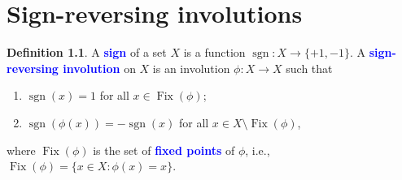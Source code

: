 \documentclass[oneside]{book}
\numberwithin{equation}{section}
\theoremstyle{definition}
\newtheorem{defn}[thm]{Definition}
\newcommand\Fix{\operatorname{Fix}}
\newcommand\sgn{\operatorname{sgn}}
\renewcommand\emph[1]{\textcolor{blue}{\bf #1}}
\begin{document}








\newpage

\appendix

\chapter{Sign-reversing involutions}
\label{sec:sign-revers-invol}

\begin{defn}
  A \emph{sign} of a set \( X \) is a function
  \( \sgn:X \to \{+1,-1\} \). A \emph{sign-reversing involution} on
  \( X \) is an involution \( \phi:X\to X \) such that
  \begin{enumerate}
  \item \( \sgn(x)=1 \) for all \( x\in \Fix(\phi) \);
  \item \( \sgn(\phi(x)) = -\sgn(x) \) for all
  \( x\in X \setminus \Fix(\phi) \),
  \end{enumerate}
  where \( \Fix(\phi) \) is the set of \emph{fixed points} of
  \( \phi \), i.e., \( \Fix(\phi) = \{x\in X: \phi(x) = x \} \).
\end{defn}
\end{document}
